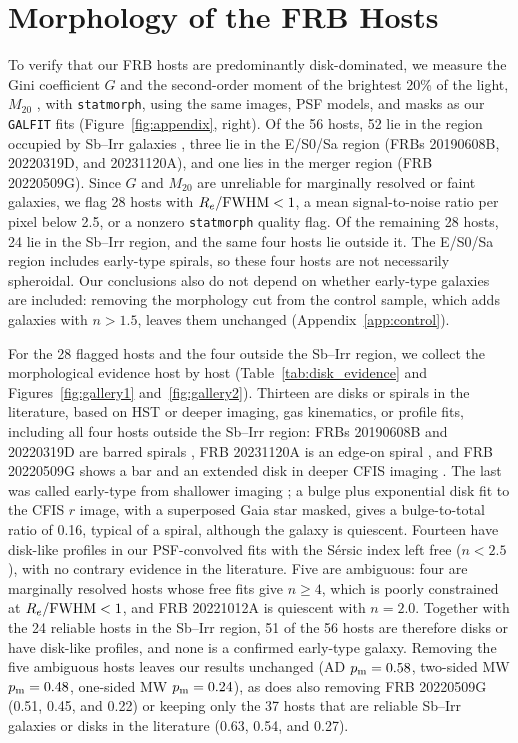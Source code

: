 \documentclass[apjl, linenumbers]{aastex701}
\begin{document}
\section{Morphology of the FRB Hosts} \label{app:morph}
 
To verify that our FRB hosts are predominantly disk-dominated, we measure the
Gini coefficient $G$ and the second-order moment of the brightest 20\% of the
light, $M_{20}$ \citep{Gini-coeff, GiniM20}, with \texttt{statmorph}, using
the same images, PSF models, and masks as our \texttt{GALFIT} fits
(Figure~\ref{fig:appendix}, right). Of the 56 hosts, 52 lie in the region
occupied by Sb--Irr galaxies \citep{GiniM20boundaries}, three lie in the E/S0/Sa region
(FRBs 20190608B, 20220319D, and 20231120A), and one lies in the merger region
(FRB 20220509G). Since $G$ and $M_{20}$ are unreliable for marginally resolved
or faint galaxies, we flag 28 hosts with $R_e/{\rm FWHM} < 1$, a mean
signal-to-noise ratio per pixel below 2.5, or a nonzero \texttt{statmorph}
quality flag. Of the remaining 28 hosts, 24 lie in the Sb--Irr region, and the
same four hosts lie outside it. The E/S0/Sa region includes early-type
spirals, so these four hosts are not necessarily spheroidal. Our conclusions
also do not depend on whether early-type galaxies are included: removing the
morphology cut from the control sample, which adds galaxies with $n > 1.5$,
leaves them unchanged (Appendix~\ref{app:control}).

For the 28 flagged hosts and the four outside the Sb--Irr region, we collect
the morphological evidence host by host (Table~\ref{tab:disk_evidence} and
Figures~\ref{fig:gallery1} and~\ref{fig:gallery2}). Thirteen are disks or
spirals in the literature, based on HST or deeper imaging, gas kinematics, or
profile fits, including all four hosts outside the Sb--Irr region:
FRBs 20190608B and 20220319D are barred spirals
\citep{chittidi2021, ravi2025}, FRB 20231120A is an edge-on spiral
\citep{sharma2024, leung2025}, and FRB 20220509G shows a bar and an extended
disk in deeper CFIS imaging \citep{bhardwaj2024local}. The last was called
early-type from shallower imaging \citep{sharma2023, connor2023}; a bulge plus
exponential disk fit to the CFIS $r$ image, with a superposed Gaia star
masked, gives a bulge-to-total ratio of 0.16, typical of a spiral, although
the galaxy is quiescent. Fourteen have disk-like profiles in our
PSF-convolved fits with the S\'ersic index left free ($n < 2.5$), with no
contrary evidence in the literature. Five are ambiguous: four are marginally
resolved hosts whose free fits give $n \geq 4$, which is poorly constrained at
$R_e/{\rm FWHM} < 1$, and FRB 20221012A is quiescent with $n = 2.0$. Together
with the 24 reliable hosts in the Sb--Irr region, 51 of the 56 hosts are
therefore disks or have disk-like profiles, and none is a confirmed early-type
galaxy. Removing the five ambiguous hosts leaves our results unchanged (AD
$p_{\rm m} = 0.58$, two-sided MW $p_{\rm m} = 0.48$, one-sided MW
$p_{\rm m} = 0.24$), as does also removing FRB 20220509G (0.51, 0.45, and
0.22) or keeping only the 37 hosts that are reliable Sb--Irr galaxies or disks
in the literature (0.63, 0.54, and 0.27).
\end{document}
